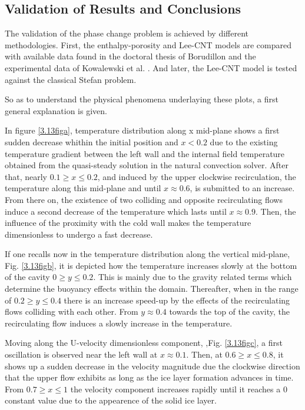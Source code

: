 \subsection{Validation of Results and Conclusions}
\label{Convection-case}
\setlength{\parindent}{0.5cm} The validation of the phase change problem is achieved by different methodologies. First, the enthalpy-porosity and Lee-CNT models are compared with available data found in the doctoral thesis of Borudillon \cite{bourdillon_2016} and the experimental data of Kowalewski et al. \cite{kowalewski_rebow_1999}. And later, the Lee-CNT model is tested against the classical Stefan problem.

\noindent So as to understand the physical phenomena underlaying these plots, a first general explanation is given. 

\noindent In figure \ref{3.13figa}, temperature distribution along x mid-plane shows a first sudden decrease whithin the initial position and $x < 0.2$ due to the existing temperature gradient between the left wall and the internal field temperature obtained from the quasi-steady solution in the natural convection solver. After that, nearly $0.1 \ge x \leq 0.2$, and induced by the upper clockwise recirculation, the temperature along this mid-plane and until $x \approx 0.6$, is submitted to an increase. From there on, the existence of two colliding and opposite recirculating flows induce a second decrease of the temperature which lasts until $x \approx 0.9$. Then, the influence of the proximity with the cold wall makes the temperature dimensionless to undergo a fast decrease.

\noindent If one recalls now in the temperature distribution along the vertical mid-plane, Fig. \ref{3.13figb}, it is depicted how the temperature increases slowly at the bottom of the cavity $0 \ge y \leq 0.2$. This is mainly due to the gravity related terms which determine the buoyancy effects within the domain. Thereafter, when in the range of $0.2 \ge y \leq 0.4$ there is an increase speed-up by the effects of the recirculating flows colliding with each other. From $y \approx 0.4$ towards the top of the cavity, the recirculating flow induces a slowly increase in the temperature.

\noindent Moving along the U-velocity dimensionless component, ,Fig. \ref{3.13figc}, a first oscillation is observed near the left wall at $x \approx 0.1$. Then, at $0.6 \ge x \leq 0.8$, it shows up a sudden decrease in the velocity magnitude due the clockwise direction that the upper flow exhibits as long as the ice layer formation advances in time. From $0.7 \ge x \leq 1$ the velocity component increases rapidly until it reaches a 0 constant value due to the appearence of the solid ice layer. 

